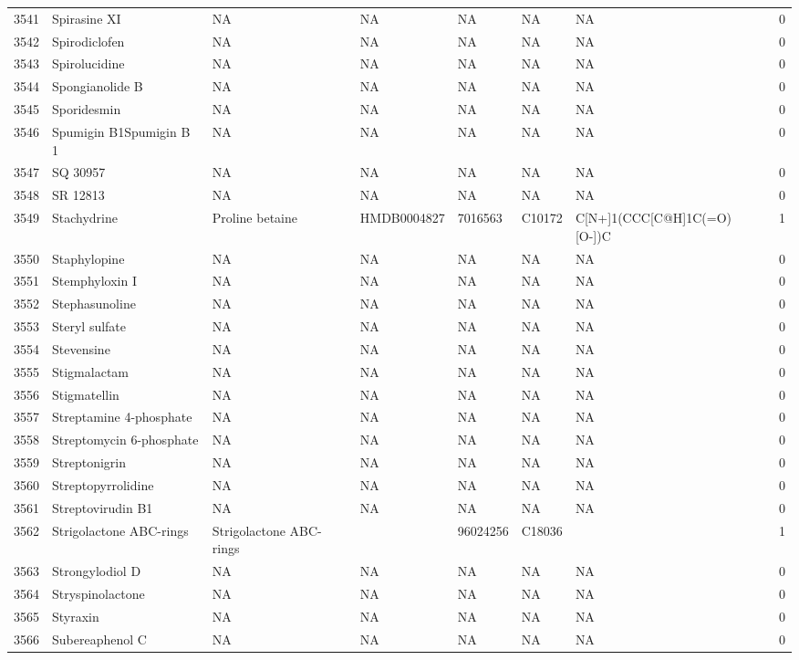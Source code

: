 \documentclass[a4paper]{article}
\begin{document}
\begin{longtable}{rlllllll}
  3541 & Spirasine XI & NA & NA & NA & NA & NA & 0 \\ 
  3542 & Spirodiclofen & NA & NA & NA & NA & NA & 0 \\ 
  3543 & Spirolucidine & NA & NA & NA & NA & NA & 0 \\ 
  3544 & Spongianolide B & NA & NA & NA & NA & NA & 0 \\ 
  3545 & Sporidesmin & NA & NA & NA & NA & NA & 0 \\ 
  3546 & Spumigin B1Spumigin B 1 & NA & NA & NA & NA & NA & 0 \\ 
  3547 & SQ 30957 & NA & NA & NA & NA & NA & 0 \\ 
  3548 & SR 12813 & NA & NA & NA & NA & NA & 0 \\ 
  3549 & Stachydrine & Proline betaine & HMDB0004827 & 7016563 & C10172 & C[N+]1(CCC[C@H]1C(=O)[O-])C & 1 \\ 
  3550 & Staphylopine & NA & NA & NA & NA & NA & 0 \\ 
  3551 & Stemphyloxin I & NA & NA & NA & NA & NA & 0 \\ 
  3552 & Stephasunoline & NA & NA & NA & NA & NA & 0 \\ 
  3553 & Steryl sulfate & NA & NA & NA & NA & NA & 0 \\ 
  3554 & Stevensine & NA & NA & NA & NA & NA & 0 \\ 
  3555 & Stigmalactam & NA & NA & NA & NA & NA & 0 \\ 
  3556 & Stigmatellin & NA & NA & NA & NA & NA & 0 \\ 
  3557 & Streptamine 4-phosphate & NA & NA & NA & NA & NA & 0 \\ 
  3558 & Streptomycin 6-phosphate & NA & NA & NA & NA & NA & 0 \\ 
  3559 & Streptonigrin & NA & NA & NA & NA & NA & 0 \\ 
  3560 & Streptopyrrolidine & NA & NA & NA & NA & NA & 0 \\ 
  3561 & Streptovirudin B1 & NA & NA & NA & NA & NA & 0 \\ 
  3562 & Strigolactone ABC-rings & Strigolactone ABC-rings &  & 96024256 & C18036 &  & 1 \\ 
  3563 & Strongylodiol D & NA & NA & NA & NA & NA & 0 \\ 
  3564 & Stryspinolactone & NA & NA & NA & NA & NA & 0 \\ 
  3565 & Styraxin & NA & NA & NA & NA & NA & 0 \\ 
  3566 & Subereaphenol C & NA & NA & NA & NA & NA & 0 \\ 

\end{longtable}
\end{document}
